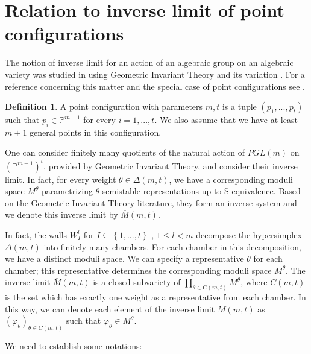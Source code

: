 \documentclass[12pt, reqno]{amsart}
\theoremstyle{definition}
\newtheorem{definition}[theorem]{Definition}
\theoremstyle{remark}
\numberwithin{equation}{section}
\begin{document}
  
\section{Relation to inverse limit of point configurations}

The notion of inverse limit for  
an action of an algebraic group on an algebraic variety was studied in \cite{Th99} using Geometric Invariant Theory \cite{Mumford}
and its variation \cite{Th94,DH98}. For a reference concerning this matter  and the special case of point configurations see
\cite{BH}.



\begin{definition}
	A point configuration with parameters $m,t$ is a tuple $(p_1,...,p_t)$ such that 
	$p_i\in \mathbb{P}^{m-1}$ for every $i=1,...,t$. We also assume that we have at least $m+1$ general points in this configuration.
\end{definition}


One can consider finitely many quotients of the natural action of $PGL(m)$ on $(\mathbb{P}^{m-1})^t$, provided by 
Geometric Invariant Theory, and consider their inverse limit.  In fact, for every weight 
$\theta \in \Delta(m,t)$, we have a corresponding moduli space 
$M^{\theta}$ parametrizing $\theta$-semistable representations up to S-equivalence. Based on the Geometric Invariant Theory literature, they form an inverse system and we denote this inverse limit by 
$\overline{M}(m,t)$.

 In fact, the walls 
$W^l_I$ for 
$I\subseteq \left\{1,...,t\right\}$ , $1\leq l<m$  decompose the hypersimplex 
$\Delta(m,t)$ into finitely many chambers. For each chamber in this decomposition, we have a distinct moduli space.
We can specify a representative $\theta$ for each chamber; this representative determines the corresponding moduli space $M^\theta$.
The inverse limit
$\overline{M}(m,t)$
is a closed subvariety of
$\prod\limits_{\theta\in C(m,t)}  M^\theta$,
where 
$C(m,t)$  is the set which has exactly one weight as a representative from each chamber. In this way, we can denote each element of the inverse limit 
$\overline{M}(m,t)$
as 
$(\varphi_{\theta})_{\theta\in C(m,t)}$ such that $\varphi_{\theta}\in M^{\theta}$.


We need to establish some notations:
\end{document}
